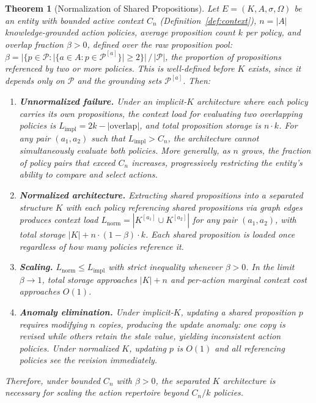 \documentclass[11pt]{article}
\newtheorem{theorem}{Theorem}
\theoremstyle{definition}
\theoremstyle{remark}
\begin{document}
\begin{theorem}[Normalization of Shared Propositions]
\label{thm:normalization}
Let $E = (K, A, \sigma, \Omega)$ be an entity with bounded active context
$C_n$ (Definition~\ref{def:context}), $n = |A|$ knowledge-grounded
action policies, average proposition count $k$ per policy, and overlap
fraction $\beta > 0$, defined over the raw proposition pool:
$\beta = |\{p \in \mathcal{P} : |\{a \in A : p \in \mathcal{P}^{[a]}\}| \geq 2\}| \,/\, |\mathcal{P}|$,
the proportion of propositions referenced by two or more policies.
This is well-defined before $K$ exists, since it depends only on
$\mathcal{P}$ and the grounding sets $\mathcal{P}^{[a]}$. Then:
\begin{enumerate}
\item[(N1)] \textbf{Unnormalized failure.} Under an implicit-$K$
   architecture where each policy carries its own propositions, the
   context load for evaluating two overlapping policies is
   $L_{\text{impl}} = 2k - |\text{overlap}|$, and total proposition
   storage is $n \cdot k$. For any pair $(a_1, a_2)$ such that
   $L_{\text{impl}} > C_n$, the architecture cannot simultaneously
   evaluate both policies. More generally, as $n$ grows, the fraction
   of policy pairs that exceed $C_n$ increases, progressively
   restricting the entity's ability to compare and select actions.
\item[(N2)] \textbf{Normalized architecture.} Extracting shared
   propositions into a separated structure $K$ with each policy
   referencing shared propositions via graph edges produces context load
   $L_{\text{norm}} = |K^{[a_1]} \cup K^{[a_2]}|$ for any pair
   $(a_1, a_2)$, with total storage $|K| + n \cdot (1 - \beta) \cdot k$.
   Each shared proposition is loaded once regardless of how many policies
   reference it.
\item[(N3)] \textbf{Scaling.} $L_{\text{norm}} \leq L_{\text{impl}}$
   with strict inequality whenever $\beta > 0$. In the limit $\beta \to 1$,
   total storage approaches $|K| + n$ and per-action marginal context
   cost approaches $O(1)$.
\item[(N4)] \textbf{Anomaly elimination.} Under implicit-$K$, updating
   a shared proposition $p$ requires modifying $n$ copies, producing the
   update anomaly: one copy is revised while others retain the stale
   value, yielding inconsistent action policies. Under normalized $K$,
   updating $p$ is $O(1)$ and all referencing policies see the revision
   immediately.
\end{enumerate}
Therefore, under bounded $C_n$ with $\beta > 0$, the separated $K$
architecture is necessary for scaling the action repertoire beyond
$C_n / k$ policies.
\end{theorem}
\end{document}
